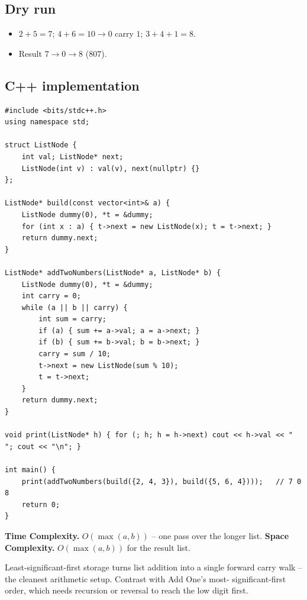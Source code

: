 \subsection*{Dry run}


\begin{itemize}
  \item $2{+}5{=}7$; $4{+}6{=}10\to0$ carry $1$; $3{+}4{+}1{=}8$.
  \item Result $7\to0\to8$ ($807$).
\end{itemize}

\subsection*{C++ implementation}

\begin{lstlisting}
#include <bits/stdc++.h>
using namespace std;

struct ListNode {
    int val; ListNode* next;
    ListNode(int v) : val(v), next(nullptr) {}
};

ListNode* build(const vector<int>& a) {
    ListNode dummy(0), *t = &dummy;
    for (int x : a) { t->next = new ListNode(x); t = t->next; }
    return dummy.next;
}

ListNode* addTwoNumbers(ListNode* a, ListNode* b) {
    ListNode dummy(0), *t = &dummy;
    int carry = 0;
    while (a || b || carry) {
        int sum = carry;
        if (a) { sum += a->val; a = a->next; }
        if (b) { sum += b->val; b = b->next; }
        carry = sum / 10;
        t->next = new ListNode(sum % 10);
        t = t->next;
    }
    return dummy.next;
}

void print(ListNode* h) { for (; h; h = h->next) cout << h->val << " "; cout << "\n"; }

int main() {
    print(addTwoNumbers(build({2, 4, 3}), build({5, 6, 4})));   // 7 0 8
    return 0;
}
\end{lstlisting}

\begin{complexitybox}
\textbf{Time Complexity.} $O(\max(a,b))$ -- one pass over the longer list.
\textbf{Space Complexity.} $O(\max(a,b))$ for the result list.
\end{complexitybox}

\begin{takeawaybox}
Least-significant-first storage turns list addition into a single forward
carry walk -- the cleanest arithmetic setup. Contrast with Add One's most-
significant-first order, which needs recursion or reversal to reach the
low digit first.
\end{takeawaybox}
